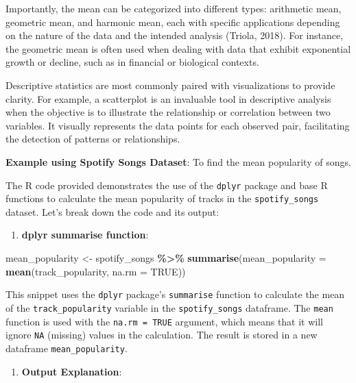 \documentclass[
]{book}
\newenvironment{Shaded}{\begin{snugshade}}{\end{snugshade}}
\newcommand{\AttributeTok}[1]{\textcolor[rgb]{0.13,0.29,0.53}{#1}}
\newcommand{\ConstantTok}[1]{\textcolor[rgb]{0.56,0.35,0.01}{#1}}
\newcommand{\FunctionTok}[1]{\textcolor[rgb]{0.13,0.29,0.53}{\textbf{#1}}}
\newcommand{\NormalTok}[1]{#1}
\newcommand{\OtherTok}[1]{\textcolor[rgb]{0.56,0.35,0.01}{#1}}
\newcommand{\SpecialCharTok}[1]{\textcolor[rgb]{0.81,0.36,0.00}{\textbf{#1}}}
\providecommand{\tightlist}{%
  \setlength{\itemsep}{0pt}\setlength{\parskip}{0pt}}
\begin{document}
Importantly, the mean can be categorized into different types: arithmetic mean, geometric mean, and harmonic mean, each with specific applications depending on the nature of the data and the intended analysis (Triola, 2018). For instance, the geometric mean is often used when dealing with data that exhibit exponential growth or decline, such as in financial or biological contexts.

Descriptive statistics are most commonly paired with visualizations to provide clarity. For example, a scatterplot is an invaluable tool in descriptive analysis when the objective is to illustrate the relationship or correlation between two variables. It visually represents the data points for each observed pair, facilitating the detection of patterns or relationships.

\textbf{Example using Spotify Songs Dataset}: To find the mean popularity of songs.

The R code provided demonstrates the use of the \texttt{dplyr} package and base R functions to calculate the mean popularity of tracks in the \texttt{spotify\_songs} dataset. Let's break down the code and its output:

\begin{enumerate}
\def\labelenumi{\arabic{enumi}.}
\tightlist
\item
  \textbf{dplyr summarise function}:
\end{enumerate}

\begin{Shaded}
\begin{Highlighting}[]
\NormalTok{mean\_popularity }\OtherTok{\textless{}{-}}\NormalTok{ spotify\_songs }\SpecialCharTok{\%\textgreater{}\%}
  \FunctionTok{summarise}\NormalTok{(}\AttributeTok{mean\_popularity =} \FunctionTok{mean}\NormalTok{(track\_popularity, }\AttributeTok{na.rm =} \ConstantTok{TRUE}\NormalTok{))}
\end{Highlighting}
\end{Shaded}

This snippet uses the \texttt{dplyr} package's \texttt{summarise} function to calculate the mean of the \texttt{track\_popularity} variable in the \texttt{spotify\_songs} dataframe. The \texttt{mean} function is used with the \texttt{na.rm\ =\ TRUE} argument, which means that it will ignore \texttt{NA} (missing) values in the calculation. The result is stored in a new dataframe \texttt{mean\_popularity}.

\begin{enumerate}
\def\labelenumi{\arabic{enumi}.}
\setcounter{enumi}{1}
\tightlist
\item
  \textbf{Output Explanation}:
\end{enumerate}
\end{document}
